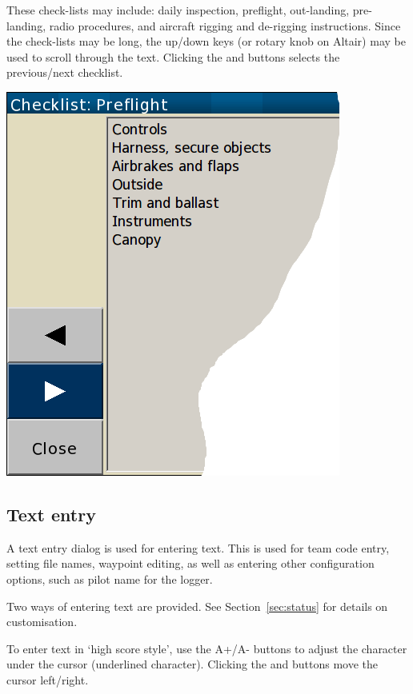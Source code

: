 These check-lists may include: daily inspection, preflight, out-landing,
pre-landing, radio procedures, and aircraft rigging and de-rigging
instructions.  Since the check-lists may be long, the up/down keys (or rotary
knob on Altair) may be used to scroll through the text. Clicking the
\button{$<$} and \button{$>$} buttons selects the previous/next checklist.

\begin{center}
\includegraphics[angle=0,width=0.8\linewidth,keepaspectratio='true']{figures/checklist.png}
\end{center}


\subsection*{Text entry} \label{sec:textentry}
A text entry dialog is used for entering text.  This is used for team
code entry, setting file names, waypoint editing, as well as entering
other configuration options, such as pilot name for the logger.

Two ways of entering text are provided. See Section~\ref{sec:status} for details on customisation.

To enter text in `high score style', use the A+/A- buttons to adjust the character under the
cursor (underlined character). Clicking the \button{$<$} and \button{$>$} buttons move the
cursor left/right.  

